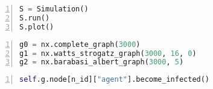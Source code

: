 \documentclass[25pt,a4paper]{article}
\begin{document}
\begin{lstlisting}[language=Python,frame=single,numbers=left,title=Script: Possibility for creating; running; and plotting the simulation (using the Simulation class and methods above)]
S = Simulation()
S.run()
S.plot()
\end{lstlisting}
\normalsize

\begin{lstlisting}[language=Python,frame=single,numbers=left,title=Script: Network generating commands for complete graphs; multiple-ring network structures; and preferential attachment networks]
g0 = nx.complete_graph(3000)
g1 = nx.watts_strogatz_graph(3000, 16, 0)
g2 = nx.barabasi_albert_graph(3000, 5)
\end{lstlisting}
\normalsize

\begin{lstlisting}[language=Python,frame=single,numbers=left,title=Script: Code for removing a specific node from the network]
                        self.g.node[n_id]["agent"].become_infected()
\end{lstlisting}
\normalsize
\end{document}
